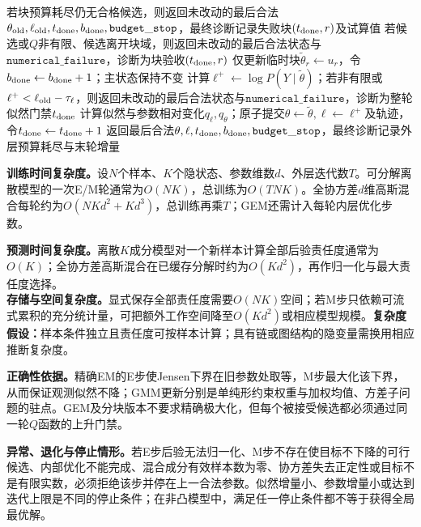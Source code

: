 \begin{AlgorithmContract}
\begin{algorithm}[H]
{{    若块预算耗尽仍无合格候选，则返回未改动的最后合法$\theta_{\rm old},\ell_{\rm old},t_{\rm done},b_{\rm done},\mathtt{budget\_stop}$，最终诊断记录失败块$(t_{\rm done},r)$及试算值\;
    若候选或$Q$非有限、候选离开块域，则返回未改动的最后合法状态与$\mathtt{numerical\_failure}$，诊断为块验收$(t_{\rm done},r)$\;
    仅更新临时块$\widetilde\theta_r\leftarrow u_r$，令$b_{\rm done}\leftarrow b_{\rm done}+1$；主状态保持不变\;
  }
  计算$\ell^+\leftarrow\log P(Y\mid\widetilde\theta)$；若非有限或$\ell^+<\ell_{\rm old}-\tau_\ell$，则返回未改动的最后合法状态与$\mathtt{numerical\_failure}$，诊断为整轮似然门禁$t_{\rm done}$\;
  计算似然与参数相对变化$q_\ell,q_\theta$；原子提交$\theta\leftarrow\widetilde\theta,\ell\leftarrow\ell^+$及轨迹，令$t_{\rm done}\leftarrow t_{\rm done}+1$\;
}
返回最后合法$\theta,\ell,t_{\rm done},b_{\rm done},\mathtt{budget\_stop}$，最终诊断记录外层预算耗尽与末轮增量\;
\end{algorithm}
\end{AlgorithmContract}

\label{struct:V3-C04-CH26}
\label{struct:V3-C04-CH27}
\begin{complexitybox}
\textbf{训练时间复杂度。}设$N$个样本、$K$个隐状态、参数维数$d$、外层迭代数$T$。可分解离散模型的一次E/M轮通常为$O(NK)$，总训练为$O(TNK)$。全协方差$d$维高斯混合每轮约为$O(NKd^2+Kd^3)$，总训练再乘$T$；GEM还需计入每轮内层优化步数。

\textbf{预测时间复杂度。}离散$K$成分模型对一个新样本计算全部后验责任度通常为$O(K)$；全协方差高斯混合在已缓存分解时约为$O(Kd^2)$，再作归一化与最大责任度选择。\\
\textbf{存储与空间复杂度。}显式保存全部责任度需要$O(NK)$空间；若M步只依赖可流式累积的充分统计量，可把额外工作空间降至$O(Kd^2)$或相应模型规模。\textbf{复杂度假设：}样本条件独立且责任度可按样本计算；具有链或图结构的隐变量需换用相应推断复杂度。

\textbf{正确性依据。}精确EM的E步使Jensen下界在旧参数处取等，M步最大化该下界，从而保证观测似然不降；GMM更新分别是单纯形约束权重与加权均值、方差子问题的驻点。GEM及分块版本不要求精确极大化，但每个被接受候选都必须通过同一轮$Q$函数的上升门禁。

\textbf{异常、退化与停止情形。}若E步后验无法归一化、M步不存在使目标不下降的可行候选、内部优化不能完成、混合成分有效样本数为零、协方差失去正定性或目标不是有限实数，必须拒绝该步并停在上一合法参数。似然增量小、参数增量小或达到迭代上限是不同的停止条件；在非凸模型中，满足任一停止条件都不等于获得全局最优解。
\end{complexitybox}


